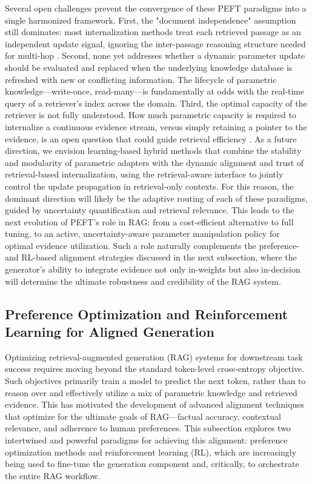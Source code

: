\documentclass[11pt,a4paper]{article}
\begin{document}
Several open challenges prevent the convergence of these PEFT paradigms into a single harmonized framework. First, the "document independence" assumption still dominates: most internalization methods treat each retrieved passage as an independent update signal, ignoring the inter-passage reasoning structure needed for multi-hop \cite{arxiv:2009.12756v2}. Second, none yet addresses whether a dynamic parameter update should be evaluated and replaced when the underlying knowledge database is refreshed with new or conflicting information. The lifecycle of parametric knowledge---write-once, read-many---is fundamentally at odds with the real-time query of a retriever's index across the domain. Third, the optimal capacity of the retriever is not fully understood. How much parametric capacity is required to internalize a continuous evidence stream, versus simply retaining a pointer to the evidence, is an open question that could guide retrieval efficiency \cite{arxiv:2411.07396v1}. As a future direction, we envision learning-based hybrid methods that combine the stability and modularity of parametric adapters with the dynamic alignment and trust of retrieval-based internalization, using the retrieval-aware interface to jointly control the update propagation in retrieval-only contexts. For this reason, the dominant direction will likely be the adaptive routing of each of these paradigms, guided by uncertainty quantification and retrieval relevance. This leads to the next evolution of PEFT's role in RAG: from a cost-efficient alternative to full tuning, to an active, uncertainty-aware parameter manipulation policy for optimal evidence utilization. Such a role naturally complements the preference- and RL-based alignment strategies discussed in the next subsection, where the generator's ability to integrate evidence not only in-weights but also in-decision will determine the ultimate robustness and credibility of the RAG system.


\subsection{Preference Optimization and Reinforcement Learning for Aligned Generation}


Optimizing retrieval-augmented generation (RAG) systems for downstream task success requires moving beyond the standard token-level cross-entropy objective. Such objectives primarily train a model to predict the next token, rather than to reason over and effectively utilize a mix of parametric knowledge and retrieved evidence. This has motivated the development of advanced alignment techniques that optimize for the ultimate goals of RAG---factual accuracy, contextual relevance, and adherence to human preferences. This subsection explores two intertwined and powerful paradigms for achieving this alignment: preference optimization methods and reinforcement learning (RL), which are increasingly being used to fine-tune the generation component and, critically, to orchestrate the entire RAG workflow.
\end{document}
